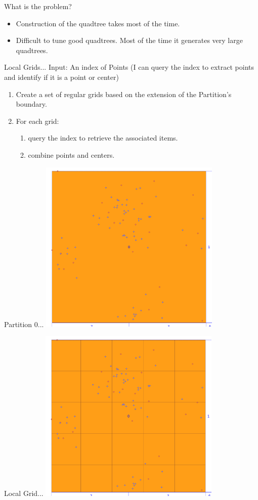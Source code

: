 \documentclass{beamer}
\begin{document}
\begin{frame}{What is the problem?}
    \begin{itemize}
        \item Construction of the quadtree takes most of the time.
        \item Difficult to tune good quadtrees.  Most of the time it generates very large quadtrees.
    \end{itemize}
\end{frame}

\begin{frame}{Local Grids...}
    Input: An index of Points (I can query the index to extract points and identify if it is a point or center)
    \begin{enumerate}
     \item Create a set of regular grids based on the extension of the Partition's boundary.
     \item For each grid:
        \begin{enumerate}
            \item query the index to retrieve the associated items.
            \item combine points and centers.
        \end{enumerate}
    \end{enumerate}
\end{frame}
\begin{frame}{Partition 0...}
    \centering
    \includegraphics[width=0.65\textwidth]{figures/05-Partition0}
\end{frame}
\begin{frame}{Local Grid...}
    \centering
    \includegraphics[width=0.65\textwidth]{figures/07-LGrids}
\end{frame}
\end{document}
